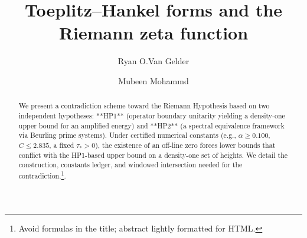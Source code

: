 \documentclass[11pt]{nyjm} %
\title{Toeplitz–Hankel forms and the Riemann zeta function}
\author[A. Author]{Ryan O.Van Gelder}
\author[B. Author]{Mubeen Mohammd}
\theoremstyle{definition}
\begin{document}
 
 
\begin{abstract}  
      We present a contradiction scheme toward the Riemann Hypothesis based on two independent hypotheses: **HP1** (operator boundary unitarity yielding a density-one upper bound for an amplified energy) and **HP2** (a spectral equivalence framework via Beurling prime systems). Under certified numerical constants (e.g., $\alpha\!\ge\!0.100$, $C\!\le\!2.835$, a fixed $\tau_*>0$), the existence of an off-line zero forces lower bounds that conflict with the HP1-based upper bound on a density-one set of heights. We detail the construction, constants ledger, and windowed intersection needed for the contradiction.\footnote{Avoid formulas in the title; abstract lightly formatted for HTML.}.
\end{abstract} 
\maketitle
\tableofcontents



\end{document}
